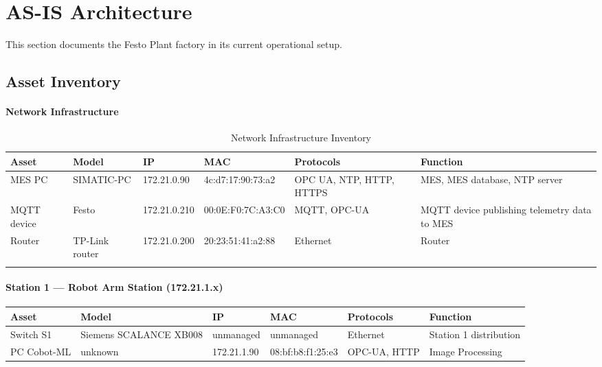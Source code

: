 \documentclass[11pt,a4paper]{article}
\begin{document}
\section{AS-IS Architecture}
This section documents the Festo Plant factory in its current operational
setup. \\

\subsection{Asset Inventory}
{\scriptsize
\setlength{\tabcolsep}{3pt}

\paragraph{Network Infrastructure}
\begin{longtable}{L{2cm} L{2.1cm} L{2.1cm} L{2.6cm} L{2.4cm} L{4cm}}
\toprule
\textbf{Asset} & \textbf{Model} & \textbf{IP} & \textbf{MAC} & \textbf{Protocols} & \textbf{Function} \\
\midrule \endhead
    MES PC & SIMATIC-PC & 172.21.0.90 & 4c:d7:17:90:73:a2 & OPC
    UA, NTP, HTTP, HTTPS & MES, MES database, NTP server \\

    MQTT device & Festo & 172.21.0.210 & 00:0E:F0:7C:A3:C0 &
    MQTT, OPC-UA & MQTT device publishing telemetry data to MES \\

    Router & TP-Link router & 172.21.0.200 &
    20:23:51:41:a2:88 & Ethernet & Router \\
\bottomrule
    \caption{Network Infrastructure Inventory}
\end{longtable}

\pagebreak
\paragraph{Station 1 --- Robot Arm Station (172.21.1.x)}
\begin{longtable}{L{2cm} L{2.1cm} L{2.1cm} L{2.6cm} L{2.4cm} L{4cm}}
\toprule
\textbf{Asset} & \textbf{Model} & \textbf{IP} & \textbf{MAC} & \textbf{Protocols} & \textbf{Function} \\
\midrule \endhead
    Switch S1 & Siemens SCALANCE XB008 & unmanaged & unmanaged & Ethernet &
    Station 1 distribution \\

    PC Cobot-ML & unknown & 172.21.1.90 & 08:bf:b8:f1:25:e3 & OPC-UA, HTTP &
    Image Processing \\


\end{longtable}}
\end{document}
